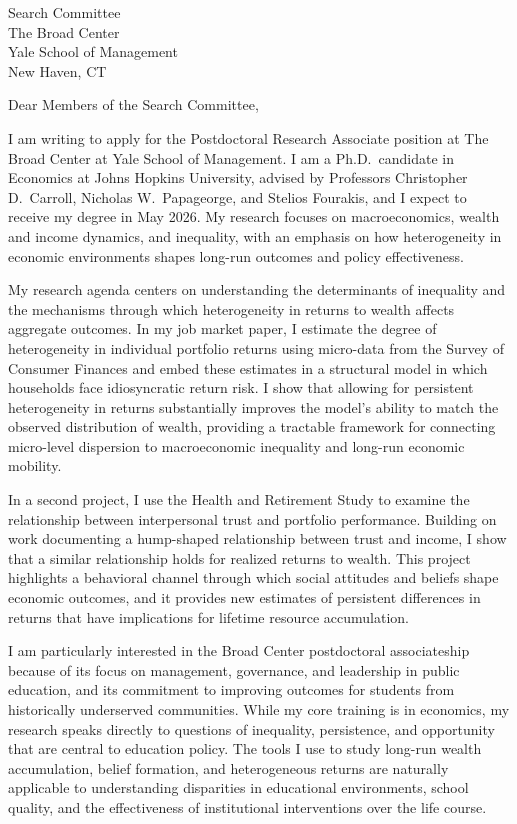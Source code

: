 \documentclass[11pt,letterpaper]{letter}
\begin{document}
\begin{letter}{
Search Committee \\
The Broad Center \\
Yale School of Management \\
New Haven, CT
}

\opening{Dear Members of the Search Committee,}

I am writing to apply for the Postdoctoral Research Associate position at The Broad Center at Yale School of Management. I am a Ph.D.\ candidate in Economics at Johns Hopkins University, advised by Professors Christopher D.~Carroll, Nicholas W.~Papageorge, and Stelios Fourakis, and I expect to receive my degree in May 2026. My research focuses on macroeconomics, wealth and income dynamics, and inequality, with an emphasis on how heterogeneity in economic environments shapes long-run outcomes and policy effectiveness.

My research agenda centers on understanding the determinants of inequality and the mechanisms through which heterogeneity in returns to wealth affects aggregate outcomes. In my job market paper, I estimate the degree of heterogeneity in individual portfolio returns using micro-data from the Survey of Consumer Finances and embed these estimates in a structural model in which households face idiosyncratic return risk. I show that allowing for persistent heterogeneity in returns substantially improves the model’s ability to match the observed distribution of wealth, providing a tractable framework for connecting micro-level dispersion to macroeconomic inequality and long-run economic mobility.

In a second project, I use the Health and Retirement Study to examine the relationship between interpersonal trust and portfolio performance. Building on work documenting a hump-shaped relationship between trust and income, I show that a similar relationship holds for realized returns to wealth. This project highlights a behavioral channel through which social attitudes and beliefs shape economic outcomes, and it provides new estimates of persistent differences in returns that have implications for lifetime resource accumulation.

I am particularly interested in the Broad Center postdoctoral associateship because of its focus on management, governance, and leadership in public education, and its commitment to improving outcomes for students from historically underserved communities. While my core training is in economics, my research speaks directly to questions of inequality, persistence, and opportunity that are central to education policy. The tools I use to study long-run wealth accumulation, belief formation, and heterogeneous returns are naturally applicable to understanding disparities in educational environments, school quality, and the effectiveness of institutional interventions over the life course.


\end{letter}
\end{document}
